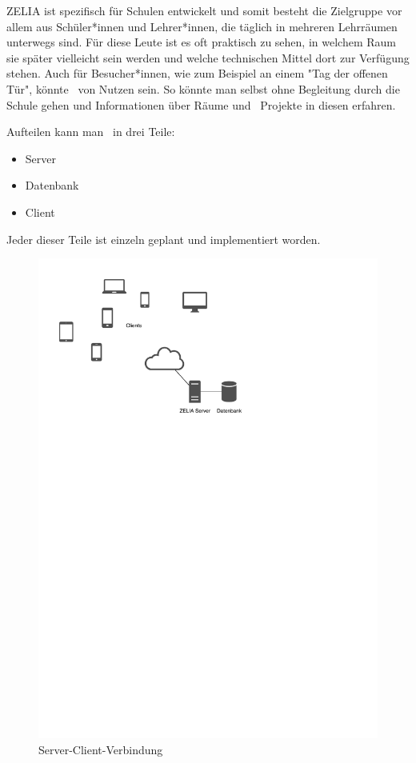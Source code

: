 ZELIA ist spezifisch für Schulen entwickelt und somit besteht die Zielgruppe vor allem aus Schüler*innen und Lehrer*innen, die täglich in mehreren Lehrräumen unterwegs sind. Für diese Leute ist es oft praktisch zu sehen, in welchem Raum sie später vielleicht sein werden und welche technischen Mittel dort zur Verfügung stehen. Auch für Besucher*innen, wie zum Beispiel an einem "Tag der offenen Tür", könnte \ZELIA\ von Nutzen sein. So könnte man selbst ohne Begleitung durch die Schule gehen und Informationen über Räume und \zb\ Projekte in diesen erfahren.

\begin{minipage}{\textwidth}
    Aufteilen kann man \ZELIA\ in drei Teile: 
    \begin{itemize}
        \item Server
        \item Datenbank
        \item Client
    \end{itemize}
    Jeder dieser Teile ist einzeln geplant und implementiert worden.
\end{minipage}

\begin{figure}[H]
    \centering
    \includegraphics[width=120mm]{./media/Intro/client_server_arch.svg.pdf}
    \caption{Server-Client-Verbindung}
\end{figure}

